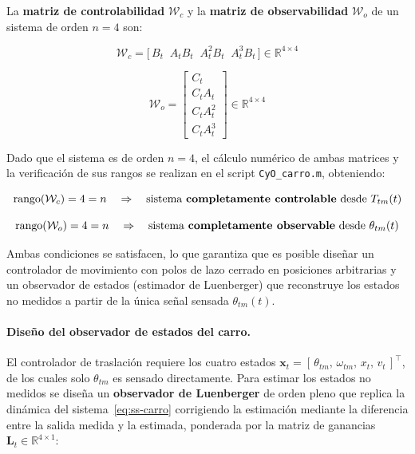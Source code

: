 \documentclass[12pt, a4paper]{article}
\begin{document}
La \textbf{matriz de controlabilidad} $\mathcal{W}_c$ y la \textbf{matriz de
observabilidad} $\mathcal{W}_o$ de un sistema de orden $n = 4$ son:

\begin{equation}
    \label{eq:wc-t}
    \mathcal{W}_c = \bigl[\,B_t \;\; A_t B_t \;\; A_t^2 B_t \;\; A_t^3 B_t\,\bigr]
    \in \mathbb{R}^{4\times 4}
\end{equation}

\begin{equation}
    \label{eq:wo-t}
    \mathcal{W}_o =
    \begin{bmatrix} C_t \\ C_t A_t \\ C_t A_t^2 \\ C_t A_t^3 \end{bmatrix}
    \in \mathbb{R}^{4\times 4}
\end{equation}

Dado que el sistema es de orden $n = 4$, el cálculo numérico de ambas matrices y la
verificación de sus rangos se realizan en el script \texttt{CyO\_carro.m}, obteniendo:

\begin{equation}
    \label{eq:rank-t}
    \operatorname{rango}(\mathcal{W}_c) = 4 = n
    \quad \Rightarrow \quad \text{sistema \textbf{completamente controlable} desde } T_{tm}(t)
\end{equation}

\begin{equation}
    \label{eq:rank-obs-t}
    \operatorname{rango}(\mathcal{W}_o) = 4 = n
    \quad \Rightarrow \quad \text{sistema \textbf{completamente observable} desde } \theta_{tm}(t)
\end{equation}

Ambas condiciones se satisfacen, lo que garantiza que es posible diseñar un controlador
de movimiento con polos de lazo cerrado en posiciones arbitrarias y un observador de
estados (estimador de Luenberger) que reconstruye los estados no medidos a partir de
la única señal sensada $\theta_{tm}(t)$.

\paragraph{Diseño del observador de estados del carro.}\leavevmode
\label{subsubsec:obs-carro}

El controlador de traslación requiere los cuatro estados
$\mathbf{x}_t = [\,\theta_{tm},\,\omega_{tm},\,x_t,\,v_t\,]^\top$, de los cuales solo
$\theta_{tm}$ es sensado directamente. Para estimar los estados no medidos se diseña un
\textbf{observador de Luenberger} de orden pleno que replica la dinámica del
sistema~\eqref{eq:ss-carro} corrigiendo la estimación mediante la diferencia entre la
salida medida y la estimada, ponderada por la matriz de ganancias
$\mathbf{L}_t \in \mathbb{R}^{4\times 1}$:
\end{document}
